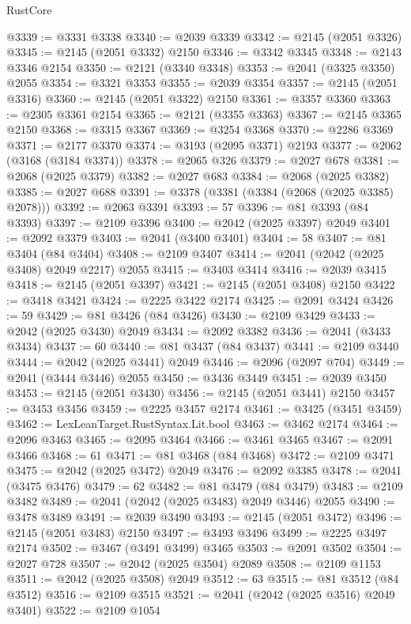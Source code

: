 \begin{lexlean}{RustCore}
\begin{coremodule}
@3339 := @3331 @3338
@3340 := @2039 @3339
@3342 := @2145 (@2051 @3326)
@3345 := @2145 (@2051 @3332) @2150
@3346 := @3342 @3345
@3348 := @2143 @3346 @2154
@3350 := @2121 (@3340 @3348)
@3353 := @2041 (@3325 @3350) @2055
@3354 := @3321 @3353
@3355 := @2039 @3354
@3357 := @2145 (@2051 @3316)
@3360 := @2145 (@2051 @3322) @2150
@3361 := @3357 @3360
@3363 := @2305 @3361 @2154
@3365 := @2121 (@3355 @3363)
@3367 := @2145 @3365 @2150
@3368 := @3315 @3367
@3369 := @3254 @3368
@3370 := @2286 @3369
@3371 := @2177 @3370
@3374 := @3193 (@2095 @3371) @2193
@3377 := @2062 (@3168 (@3184 @3374))
@3378 := @2065 @326
@3379 := @2027 @678
@3381 := @2068 (@2025 @3379)
@3382 := @2027 @683
@3384 := @2068 (@2025 @3382)
@3385 := @2027 @688
@3391 := @3378 (@3381 (@3384 (@2068 (@2025 @3385) @2078)))
@3392 := @2063 @3391
@3393 := 57
@3396 := @81 @3393 (@84 @3393)
@3397 := @2109 @3396
@3400 := @2042 (@2025 @3397) @2049
@3401 := @2092 @3379
@3403 := @2041 (@3400 @3401)
@3404 := 58
@3407 := @81 @3404 (@84 @3404)
@3408 := @2109 @3407
@3414 := @2041 (@2042 (@2025 @3408) @2049 @2217) @2055
@3415 := @3403 @3414
@3416 := @2039 @3415
@3418 := @2145 (@2051 @3397)
@3421 := @2145 (@2051 @3408) @2150
@3422 := @3418 @3421
@3424 := @2225 @3422 @2174
@3425 := @2091 @3424
@3426 := 59
@3429 := @81 @3426 (@84 @3426)
@3430 := @2109 @3429
@3433 := @2042 (@2025 @3430) @2049
@3434 := @2092 @3382
@3436 := @2041 (@3433 @3434)
@3437 := 60
@3440 := @81 @3437 (@84 @3437)
@3441 := @2109 @3440
@3444 := @2042 (@2025 @3441) @2049
@3446 := @2096 (@2097 @704)
@3449 := @2041 (@3444 @3446) @2055
@3450 := @3436 @3449
@3451 := @2039 @3450
@3453 := @2145 (@2051 @3430)
@3456 := @2145 (@2051 @3441) @2150
@3457 := @3453 @3456
@3459 := @2225 @3457 @2174
@3461 := @3425 (@3451 @3459)
@3462 := LexLeanTarget.RustSyntax.Lit.bool
@3463 := @3462 @2174
@3464 := @2096 @3463
@3465 := @2095 @3464
@3466 := @3461 @3465
@3467 := @2091 @3466
@3468 := 61
@3471 := @81 @3468 (@84 @3468)
@3472 := @2109 @3471
@3475 := @2042 (@2025 @3472) @2049
@3476 := @2092 @3385
@3478 := @2041 (@3475 @3476)
@3479 := 62
@3482 := @81 @3479 (@84 @3479)
@3483 := @2109 @3482
@3489 := @2041 (@2042 (@2025 @3483) @2049 @3446) @2055
@3490 := @3478 @3489
@3491 := @2039 @3490
@3493 := @2145 (@2051 @3472)
@3496 := @2145 (@2051 @3483) @2150
@3497 := @3493 @3496
@3499 := @2225 @3497 @2174
@3502 := @3467 (@3491 @3499) @3465
@3503 := @2091 @3502
@3504 := @2027 @728
@3507 := @2042 (@2025 @3504) @2089
@3508 := @2109 @1153
@3511 := @2042 (@2025 @3508) @2049
@3512 := 63
@3515 := @81 @3512 (@84 @3512)
@3516 := @2109 @3515
@3521 := @2041 (@2042 (@2025 @3516) @2049 @3401)
@3522 := @2109 @1054

\end{coremodule}
\end{lexlean}
